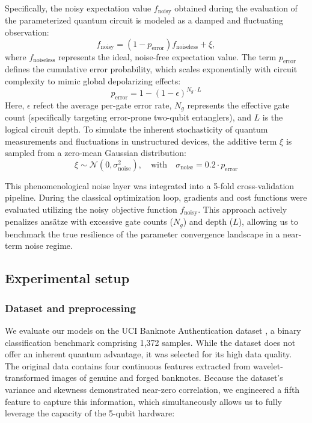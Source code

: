 \documentclass[11pt]{article}
\begin{document}
Specifically, the noisy expectation value $f_{\text{noisy}}$ obtained during the evaluation of the parameterized quantum circuit is modeled as a damped and fluctuating observation:
\begin{equation}
    f_{\text{noisy}} = (1 - p_{\text{error}}) f_{\text{noiseless}} + \xi,
\end{equation}
where $f_{\text{noiseless}}$ represents the ideal, noise-free expectation value. The term $p_{\text{error}}$ defines the cumulative error probability, which scales exponentially with circuit complexity to mimic global depolarizing effects:
\begin{equation}
    p_{\text{error}} = 1 - (1 - \epsilon)^{N_g \cdot L}
\end{equation}
Here, $\epsilon$ refect the average per-gate error rate, $N_g$ represents the effective gate count (specifically targeting error-prone two-qubit entanglers), and $L$ is the logical circuit depth. To simulate the inherent stochasticity of quantum measurements and fluctuations in unstructured devices, the additive term $\xi$ is sampled from a zero-mean Gaussian distribution:
\begin{equation}
    \xi \sim \mathcal{N}(0, \sigma_{\text{noise}}^2), \quad \text{with} \quad \sigma_{\text{noise}} = 0.2 \cdot p_{\text{error}}
\end{equation}

This phenomenological noise layer was integrated into a 5-fold cross-validation pipeline. During the classical optimization loop, gradients and cost functions were evaluated utilizing the noisy objective function $f_{\text{noisy}}$. This approach actively penalizes ans\"atze with excessive gate counts ($N_g$) and depth ($L$), allowing us to benchmark the true resilience of the parameter convergence landscape in a near-term noise regime.

\subsection{Experimental setup}
\subsubsection{Dataset and preprocessing}

We evaluate our models on the UCI Banknote Authentication dataset \cite{ucibanknote}, a binary classification benchmark comprising 1,372 samples. While the dataset does not offer an inherent quantum advantage, it was selected for its high data quality. The original data contains four continuous features extracted from wavelet-transformed images of genuine and forged banknotes. Because the dataset's variance and skewness demonstrated near-zero correlation,  we engineered a fifth feature to capture this information, which simultaneously allows us to fully leverage the capacity of the 5-qubit hardware:
\end{document}
